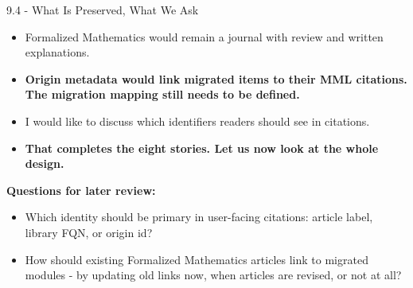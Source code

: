 \documentclass[aspectratio=169,11pt]{beamer}
\begin{document}
\begin{frame}[fragile,t]{9.4 - What Is Preserved, What We Ask}
\begin{itemize}
\setlength{\itemsep}{1pt}
\setlength{\parsep}{0pt}
\setlength{\parskip}{0pt}
\item Formalized Mathematics would remain a journal with review and written explanations.
\item \textcolor{blue!55!black}{\textbf{Origin metadata would link migrated items to their MML citations. The migration mapping still needs to be defined.}}
\item I would like to discuss which identifiers readers should see in citations.
\item \textcolor{blue!55!black}{\textbf{That completes the eight stories. Let us now look at the whole design.}}
\end{itemize}
\smallskip
\textbf{Questions for later review:}
\begin{itemize}
\setlength{\itemsep}{1pt}
\setlength{\parsep}{0pt}
\setlength{\parskip}{0pt}
\item Which identity should be primary in user-facing citations: article label, library FQN, or origin id?
\item How should existing Formalized Mathematics articles link to migrated modules - by updating old links now, when articles are revised, or not at all?
\end{itemize}
\end{frame}
\end{document}

